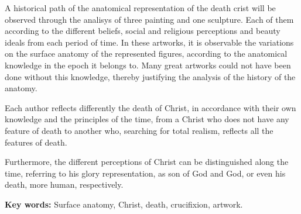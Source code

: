 A historical path of the anatomical representation of the death crist will be observed through the analisys of three painting and one sculpture. Each of them according to the different beliefs, social and religious perceptions and beauty ideals from each period of time.
In these artworks, it is observable the variations on the surface anatomy of the represented figures, according to the anatomical knowledge in the epoch it belongs to. Many great artworks could not have been done without this knowledge, thereby justifying the analysis of the history of the anatomy. 

Each author reflects differently the death of Christ, in accordance with their own knowledge and the principles of the time, from a Christ who does not have any feature of death to another who, searching for total realism, reflects all the features of death.

Furthermore, the different perceptions of Christ can be distinguished along the time, referring to his glory representation, as son of God and God, or even his death, more human, respectively.


\textbf{Key words:}
Surface anatomy, Christ, death, crucifixion, artwork.